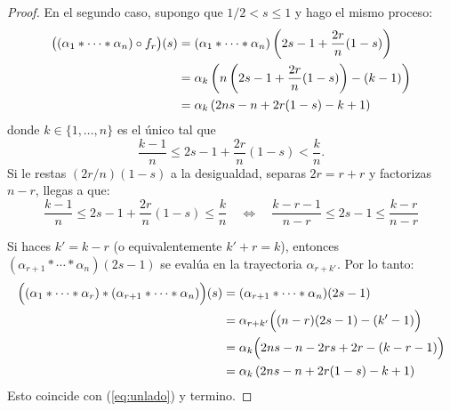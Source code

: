 \begin{proof}
En el segundo caso, supongo que $1/2<s\leq 1$ y hago el mismo proceso:
\begin{align}%
	\big((\alpha_1*\cdots*\alpha_n)\circ f_r\big)(s) & = \nonumber%
	(\alpha_1*\cdots*\alpha_n)\paren{2s-1+\frac{2r}{n}(1-s)}\nonumber\\ &=%
	\alpha_k\paren{n\paren{2s-1+\frac{2r}{n}(1-s)}-(k-1)}\nonumber\\ & =%
	\alpha_k\paren{2ns-n+2r(1-s)-k+1} \label{eq:unlado}%
\end{align}%
donde $k\in\{1,\ldots,n\}$ es el \'unico tal que
\[
	 \frac{k-1}{n}\leq 2s-1+\frac{2r}{n}(1-s) < \frac{k}{n}.
\]
Si le restas $(2r/n)(1-s)$ a la desigualdad, separas $2r=r+r$ y factorizas $n-r$, llegas a que:
\begin{equation}\label{eq:k_perfecta2}
	\frac{k-1}{n}\leq 2s-1+\frac{2r}{n}(1-s) \leq \frac{k}{n}  \quad\iff\quad 
	\frac{k-r-1}{n-r} \leq 2s-1 \leq \frac{k-r}{n-r}
\end{equation}

Si haces $k'=k-r$ (o equivalentemente $k'+r=k$), entonces $(\alpha_{r+1}*\cdots*\alpha_n)(2s-1)$ se
eval\'ua en la trayectoria $\alpha_{r+k'}$. Por lo tanto:
\begin{align*}
	\Big((\alpha_1*\cdots*\alpha_r)*(\alpha_{r+1}*\cdots*\alpha_n)\Big)(s) & =
	(\alpha_{r+1}*\cdots*\alpha_n)(2s-1)\\ & =
	\alpha_{r+k'}\Big((n-r)(2s-1)-(k'-1)\Big)\\ & =
	\alpha_k\Big( 2ns -n -2rs +2r-(k-r-1) \Big) \\ & =
	\alpha_k\left( 2ns-n+2r(1-s)-k+1 \right)
\end{align*}
Esto coincide con (\ref{eq:unlado}) y termino.






\end{proof}%

